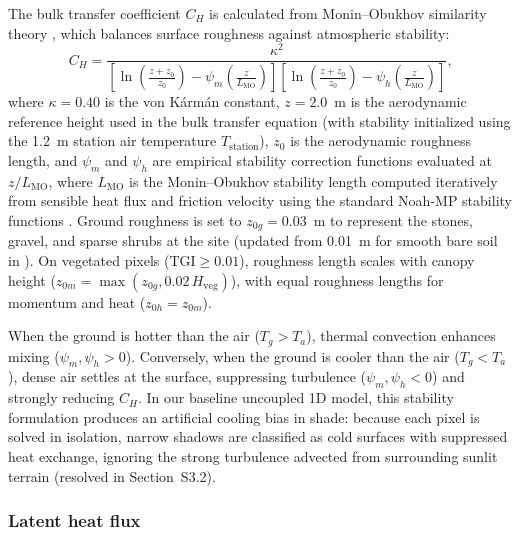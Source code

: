 \documentclass[12pt]{article}
\begin{document}
The bulk transfer coefficient $C_H$ is calculated from Monin--Obukhov similarity theory \citep{brutsaert_1982, arya_1988}, which balances surface roughness against atmospheric stability:
\begin{equation} \label{eq:CH}
C_H = \frac{\kappa^2}{\left[ \ln \left( \frac{z + z_0}{z_0} \right) - \psi_m\left(\frac{z}{L_{\textrm{MO}}}\right) \right] \left[ \ln \left( \frac{z + z_0}{z_0} \right) - \psi_h\left(\frac{z}{L_{\textrm{MO}}}\right) \right]}\textrm{,}
\end{equation}
\noindent where $\kappa = 0.40$ is the von K\'arm\'an constant, $z = 2.0$~m is the aerodynamic reference height used in the bulk transfer equation (with stability initialized using the 1.2~m station air temperature $T_{\textrm{station}}$), $z_0$ is the aerodynamic roughness length, and $\psi_m$ and $\psi_h$ are empirical stability correction functions evaluated at $z/L_{\textrm{MO}}$, where $L_{\textrm{MO}}$ is the Monin--Obukhov stability length computed iteratively from sensible heat flux and friction velocity using the standard Noah-MP stability functions \citep{niu_2011}. Ground roughness is set to $z_{0g} = 0.03$~m to represent the stones, gravel, and sparse shrubs at the site (updated from 0.01~m for smooth bare soil in \citealt{Itzkovitch2025}). On vegetated pixels ($\text{TGI} \ge 0.01$), roughness length scales with canopy height ($z_{0m} = \max(z_{0g}, 0.02\,H_{\textrm{veg}})$), with equal roughness lengths for momentum and heat ($z_{0h} = z_{0m}$).

When the ground is hotter than the air ($T_g > T_a$), thermal convection enhances mixing ($\psi_m, \psi_h > 0$). Conversely, when the ground is cooler than the air ($T_g < T_a$), dense air settles at the surface, suppressing turbulence ($\psi_m, \psi_h < 0$) and strongly reducing $C_H$. In our baseline uncoupled 1D model, this stability formulation produces an artificial cooling bias in shade: because each pixel is solved in isolation, narrow shadows are classified as cold surfaces with suppressed heat exchange, ignoring the strong turbulence advected from surrounding sunlit terrain (resolved in Section~S3.2).

\subsubsection{Latent heat flux}
\end{document}
